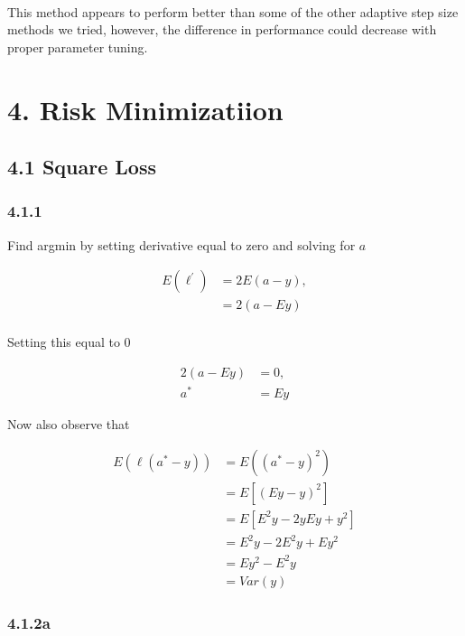 \documentclass[11pt]{article}
\begin{document}
    \begin{center}
    \end{center}
    { \hspace*{\fill} \\}
    
    This method appears to perform better than some of the other adaptive
step size methods we tried, however, the difference in performance could
decrease with proper parameter tuning.

    \section{4. Risk Minimizatiion}\label{risk-minimizatiion}

    \subsection{4.1 Square Loss}\label{square-loss}

    \subsubsection{4.1.1}\label{section}

    Find argmin by setting derivative equal to zero and solving for \(a\)

\begin{align}
E(\ell^\prime) &= 2E(a-y),\\
&= 2(a - Ey)\\
\end{align}

Setting this equal to 0

\begin{align}
2(a - Ey) &= 0, \\
a^* &= Ey
\end{align}

Now also observe that

\begin{align}
E(\ell(a^*-y)) &= E((a^*-y)^2)\\
&= E[(Ey-y)^2]\\
&= E[E^2y - 2yEy + y^2]\\
&= E^2y - 2E^2y + Ey^2\\
&= Ey^2 - E^2y\\
&= Var(y)
\end{align}

    \subsubsection{4.1.2a}\label{a}
\end{document}
